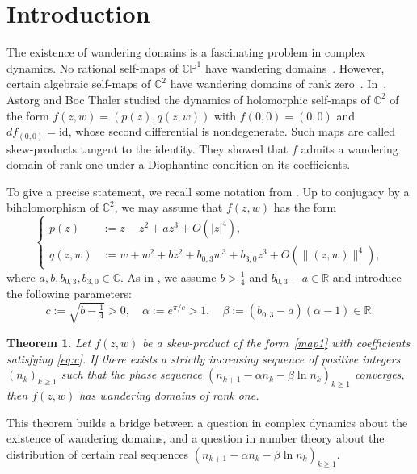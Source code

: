 \documentclass[12pt,centertags,oneside]{amsart}
\newtheorem{theorem}{Theorem}[section]
\theoremstyle{definition}
\newcommand{\bC}{\mathbb{C}}
\newcommand{\R}{\mathbb{R}}
\begin{document}
\section{Introduction}
The existence of wandering domains is a fascinating problem in complex 
dynamics. No rational self-maps of $\mathbb{CP}^1$ have wandering 
domains~\cite{Sullivan-1985}. However, certain algebraic self-maps of 
$\bC^2$ have wandering domains of rank zero~\cite{ABDPR-2016}. 
In~\cite{Astorg-Boc Thaler-2024}, Astorg and Boc Thaler studied the 
dynamics of holomorphic self-maps of $\bC^2$ of the form 
$f(z,w)=(p(z),q(z,w))$ with $f(0,0)=(0,0)$ and $df_{(0,0)}=\mathrm{id}$, 
whose second differential is nondegenerate. Such maps are called 
skew-products tangent to the identity. They showed that $f$ admits a 
wandering domain of rank one under a Diophantine condition on its 
coefficients. 

To give a precise statement, we recall some notation from \cite{Astorg-Boc 
Thaler-2024}. Up to conjugacy by a biholomorphism of $\mathbb{C}^2$, we may 
assume that $f(z,w)$ has the form \cite[(1.1)]{Astorg-Boc Thaler-2024} 
\begin{equation}\label{map1}
\left\{
	\begin{aligned}
	p(z)&:= z-z^2+a z^3+O(|z|^4),\\
    q(z,w)&:=  w+w^2+bz^2+b_{0,3} w^3+b_{3,0} z^3+O(\|(z,w)\|^4),
	\end{aligned}
\right.
\end{equation}
where $a, b, b_{0,3}, b_{3,0} \in \bC$. As in \cite[Theorem 1.6]{Astorg-Boc Thaler-2024}, we assume $b>\frac{1}{4}$ and $b_{0,3}-a\in \R$ and introduce the following parameters: 
\begin{equation}\label{eq:c} 
	c:=\sqrt{b-\tfrac{1}{4}}>0, \quad \alpha:=e^{\pi/c}>1, \quad \beta:=(b_{0,3}-a)(\alpha-1)\in \R.
\end{equation}

\begin{theorem}\label{t:ABT0}\cite[Theorem 1.6]{Astorg-Boc Thaler-2024}
Let $f(z,w)$ be a skew-product of the form~\eqref{map1} with coefficients 
satisfying \eqref{eq:c}. If there exists a strictly increasing sequence of 
positive integers $(n_k)_{k\geqslant 1}$ such that the phase sequence 
$(n_{k+1}-\alpha n_k-\beta\ln n_k)_{k\geqslant 1}$ converges, then $f(z,w)$ 
has wandering domains of rank one. 
\end{theorem}

This theorem builds a bridge between a question in complex dynamics about 
the existence of wandering domains, and a question in number theory about 
the distribution of certain real sequences $(n_{k+1}-\alpha n_k-\beta\ln 
n_k)_{k\geqslant 1}$. 
\end{document}
